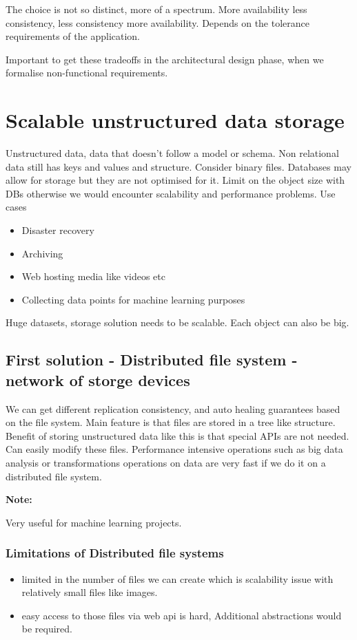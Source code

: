 \documentclass[a4paper, 11pt]{book}
\newenvironment{note}{
    \begin{siderule}
        \textbf{Note: }
        }{
    \end{siderule}}
\begin{document}
    The choice is not so distinct, more of a spectrum.
    More availability less consistency, less consistency more availability.
    Depends on the tolerance requirements of the application.

    Important to get these tradeoffs in the architectural design phase, when we formalise non-functional requirements.


    \section{Scalable unstructured data storage}
    Unstructured data, data that doesn't follow a model or schema.
    Non relational data still has keys and values and structure.
    Consider binary files.
    Databases may allow for storage but they are not optimised for it.
    Limit on the object size with DBs otherwise we would encounter scalability and performance problems.
    Use cases
    \begin{itemize}
        \item Disaster recovery
        \item Archiving
        \item Web hosting media like videos etc
        \item Collecting data points for machine learning purposes
    \end{itemize}

    Huge datasets, storage solution needs to be scalable.
    Each object can also be big.

    \subsection{First solution - Distributed file system - network of storge devices}
    We can get different replication consistency, and auto healing guarantees based on the file system.
    Main feature is that files are stored in a tree like structure.
    Benefit of storing unstructured data like this is that special APIs are not needed.
    Can easily modify these files.
    Performance intensive operations such as big data analysis or transformations operations on data are very fast if we do it on a distributed file system.
    \begin{note}
        Very useful for machine learning projects.
    \end{note}

    \subsubsection{Limitations of Distributed file systems}
    \begin{itemize}
        \item limited in the number of files we can create which is scalability issue with relatively small files like images.
        \item easy access to those files via web api is hard, Additional abstractions would be required.
    \end{itemize}
\end{document}
